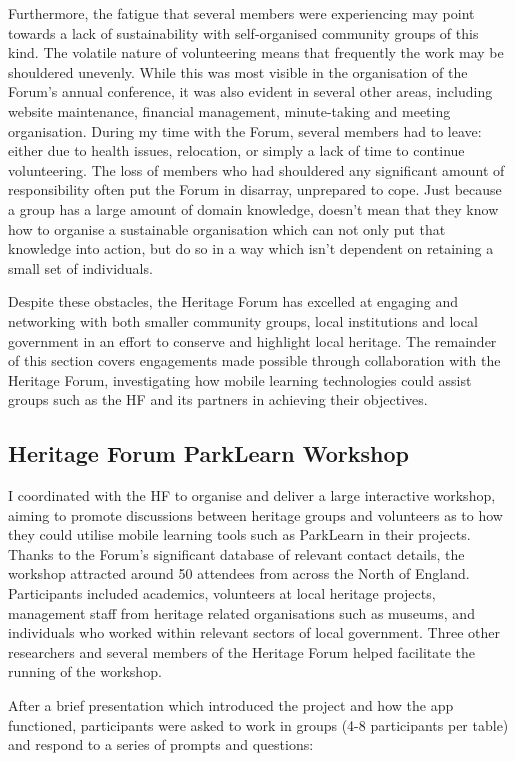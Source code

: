 Furthermore, the fatigue that several members were experiencing may point towards a lack of sustainability with self-organised community groups of this kind. The volatile nature of volunteering means that frequently the work may be shouldered unevenly. While this was most visible in the organisation of the Forum's annual conference, it was also evident in several other areas, including website maintenance, financial management, minute-taking and meeting organisation. During my time with the Forum, several members had to leave: either due to health issues, relocation, or simply a lack of time to continue volunteering. The loss of members who had shouldered any significant amount of responsibility often put the Forum in disarray, unprepared to cope. Just because a group has a large amount of domain knowledge, doesn't mean that they know how to organise a sustainable organisation which can not only put that knowledge into action, but do so in a way which isn't dependent on retaining a small set of individuals.

Despite these obstacles, the Heritage Forum has excelled at engaging and networking with both smaller community groups, local institutions and local government in an effort to conserve and highlight local heritage. The remainder of this section covers engagements made possible through collaboration with the Heritage Forum, investigating how mobile learning technologies could assist groups such as the HF and its partners in achieving their objectives.

\subsection{Heritage Forum ParkLearn Workshop}
\label{sec:HeritageParkLearnWorkshop}
I coordinated with the HF to organise and deliver a large interactive workshop, aiming to promote discussions between heritage groups and volunteers as to how they could utilise mobile learning tools such as ParkLearn in their projects. Thanks to the Forum's significant database of relevant contact details, the workshop attracted around 50 attendees from across the North of England. Participants included academics, volunteers at local heritage projects, management staff from heritage related organisations such as museums, and individuals who worked within relevant sectors of local government. Three other researchers and several members of the Heritage Forum helped facilitate the running of the workshop.

After a brief presentation which introduced the project and how the app functioned, participants were asked to work in groups (4-8 participants per table) and respond to a series of prompts and questions: 

